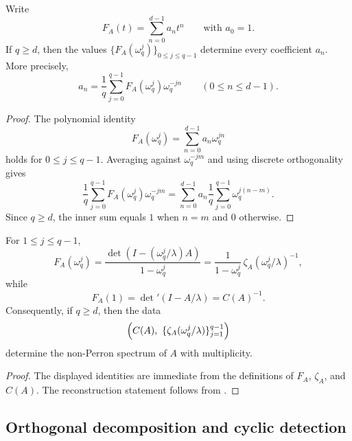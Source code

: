 \begin{proposition}
  \label{thm:finite-part-cyclic-lift-single-q-torsion-reconstruction}
  Write
  \[
    F_A(t)=\sum_{n=0}^{d-1}a_n t^n
    \qquad\text{with } a_0=1.
  \]
  If \(q\ge d\), then the values
  \(\{F_A(\omega_q^j)\}_{0\le j\le q-1}\) determine every coefficient
  \(a_n\). More precisely,
  \[
    a_n=\frac{1}{q}\sum_{j=0}^{q-1}
      F_A(\omega_q^j)\omega_q^{-jn}
    \qquad (0\le n\le d-1).
  \]
\end{proposition}

\begin{proof}
  The polynomial identity
  \[
    F_A(\omega_q^j)=\sum_{n=0}^{d-1}a_n\omega_q^{jn}
  \]
  holds for \(0\le j\le q-1\). Averaging against
  \(\omega_q^{-jm}\) and using discrete orthogonality gives
  \[
    \frac{1}{q}\sum_{j=0}^{q-1}
      F_A(\omega_q^j)\omega_q^{-jm}
    =
    \sum_{n=0}^{d-1}a_n
      \frac{1}{q}\sum_{j=0}^{q-1}\omega_q^{j(n-m)}.
  \]
  Since \(q\ge d\), the inner sum equals \(1\) when \(n=m\) and \(0\)
  otherwise.
\end{proof}

\begin{corollary}
  \label{cor:finite-part-cyclic-lift-zeta-torsion-determines-spectrum}
  For \(1\le j\le q-1\),
  \[
    F_A(\omega_q^j)
    =\frac{\det(I-(\omega_q^j/\lambda)A)}{1-\omega_q^j}
    =\frac{1}{1-\omega_q^j}\,
      \zeta_A(\omega_q^j/\lambda)^{-1},
  \]
  while
  \[
    F_A(1)=\det\nolimits'(I-A/\lambda)=C(A)^{-1}.
  \]
  Consequently, if \(q\ge d\), then the data
  \[
    \Bigl(C(A),\ \{\zeta_A(\omega_q^j/\lambda)\}_{j=1}^{q-1}\Bigr)
  \]
  determine the non-Perron spectrum of \(A\) with multiplicity.
\end{corollary}

\begin{proof}
  The displayed identities are immediate from the definitions of
  \(F_A\), \(\zeta_A\), and \(C(A)\). The reconstruction statement
  follows from
  .
\end{proof}

\subsection{Orthogonal decomposition and cyclic detection}

